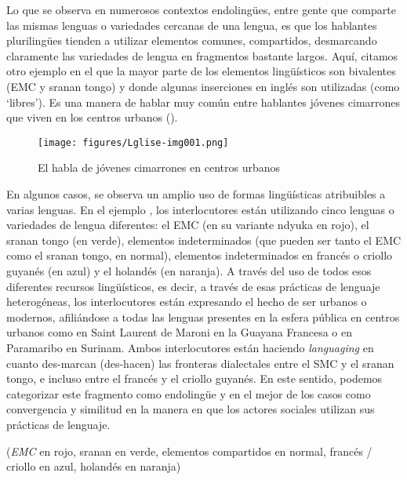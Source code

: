 \documentclass[output=paper]{langscibook}
\begin{document}
Lo que se observa en numerosos contextos endolingües, entre gente que comparte las mismas lenguas o variedades cercanas de una lengua, es que los hablantes plurilingües tienden a utilizar elementos comunes, compartidos, desmarcando claramente las variedades de lengua en fragmentos bastante largos. Aquí, citamos otro ejemplo en el que la mayor parte de los elementos lingüísticos son bivalentes (EMC y sranan tongo) y donde algunas inserciones en inglés son utilizadas (como ‘libres’). Es una manera de hablar muy común entre hablantes jóvenes cimarrones que viven en los centros urbanos ().

\begin{figure}
\caption{\label{exfig:leglise:8}El habla de jóvenes cimarrones en centros urbanos}
\texttt{[image: figures/Lglise-img001.png]}
\end{figure}
 
\newpage
En algunos casos, se observa un amplio uso de formas lingüísticas atribuibles a varias lenguas. En el ejemplo , los interlocutores están utilizando cinco lenguas o variedades de lengua diferentes: el EMC (en su variante ndyuka en rojo), el sranan tongo (en verde), elementos indeterminados (que pueden ser tanto el EMC como el sranan tongo, en normal), elementos indeterminados en francés o criollo guyanés (en azul) y el holandés (en naranja). A través del uso de todos esos diferentes recursos lingüísticos, es decir, a través de esas prácticas de lenguaje heterogéneas, los interlocutores están expresando el hecho de ser urbanos o modernos, afiliándose a todas las lenguas presentes en la esfera pública en centros urbanos como en Saint Laurent de Maroni en la Guayana Francesa o en Paramaribo en Surinam. Ambos interlocutores están haciendo \textit{languaging} en cuanto des-marcan (des-hacen) las fronteras dialectales entre el SMC y el sranan tongo, e incluso entre el francés y el criollo guyanés. En este sentido, podemos categorizar este fragmento como endolingüe y en el mejor de los casos como convergencia y similitud en la manera en que los actores sociales utilizan sus prácticas de lenguaje.

\newcommand{\emc}[1]{{\color{lsLightWine}\textit{#1}}}
\newcommand{\sra}[1]{{\color{lsDarkGreenOne}\uline{#1}}}
\newcommand{\fra}[1]{{\color{lsMidBlue}#1}}
\newcommand{\hol}[1]{{\color{lsDarkOrange}#1}}
\ea\label{ex:leglise:9}
(\emc{EMC} en rojo, sranan en verde, elementos compartidos en normal, francés / criollo en azul, {holandés} {en} {naranja)}\\\bigskip
\end{document}
